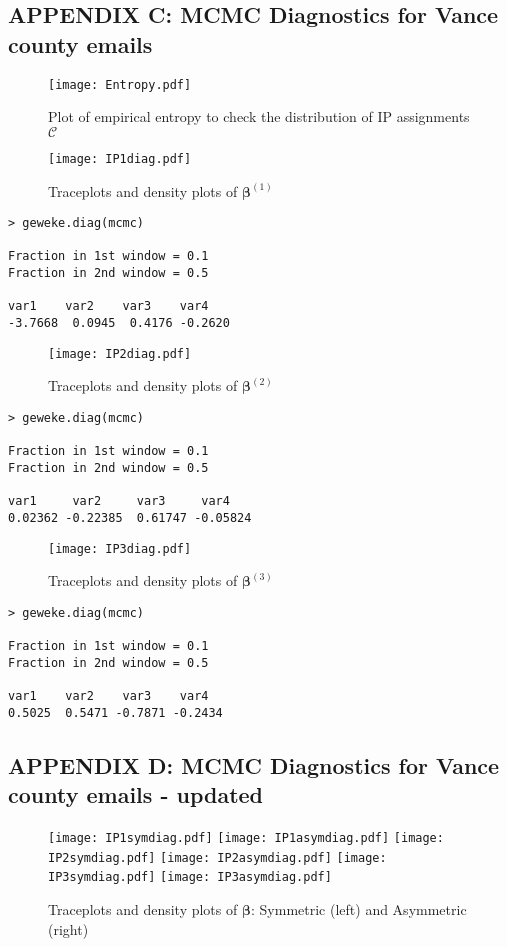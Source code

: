 \documentclass[a4paper]{article}
\begin{document}
 \subsection*{APPENDIX C: MCMC Diagnostics for Vance county emails}
 \begin{figure}[ht]
 	\centering
 	\texttt{[image: Entropy.pdf]} 
 	\caption{Plot of empirical entropy to check the distribution of IP assignments $\mathcal{C}$ }
 	\label{fig:IP1}
 \end{figure}
  \begin{figure}[ht]
 	\centering
 	\texttt{[image: IP1diag.pdf]} 
 		\caption{Traceplots and density plots of $\boldsymbol{\beta}^{(1)}$}
 	\label{fig:IP1}
 	 \end{figure}
\footnotesize
\begin{verbatim}
> geweke.diag(mcmc)

Fraction in 1st window = 0.1
Fraction in 2nd window = 0.5 

var1    var2    var3    var4 
-3.7668  0.0945  0.4176 -0.2620 
\end{verbatim} 	
\begin{figure}[ht]
	\centering
	\texttt{[image: IP2diag.pdf]} 
	\caption{Traceplots and density plots of $\boldsymbol{\beta}^{(2)}$}
	\label{fig:IP2}
\end{figure}
\footnotesize
\begin{verbatim}
> geweke.diag(mcmc)

Fraction in 1st window = 0.1
Fraction in 2nd window = 0.5 

var1     var2     var3     var4 
0.02362 -0.22385  0.61747 -0.05824 
\end{verbatim} 	 \clearpage
\begin{figure}[ht]
	\centering
	\texttt{[image: IP3diag.pdf]} 
	\caption{Traceplots and density plots of $\boldsymbol{\beta}^{(3)}$}
	\label{fig:IP3}
\end{figure}
\footnotesize
\begin{verbatim}
> geweke.diag(mcmc)

Fraction in 1st window = 0.1
Fraction in 2nd window = 0.5 

var1    var2    var3    var4 
0.5025  0.5471 -0.7871 -0.2434 
\end{verbatim} 	 
 \subsection*{APPENDIX D: MCMC Diagnostics for Vance county emails - updated}
 \begin{figure}[ht]
 	\centering
 	\texttt{[image: IP1symdiag.pdf]} 
 	 	\texttt{[image: IP1asymdiag.pdf]} 
 	 		\texttt{[image: IP2symdiag.pdf]} 
 	 		\texttt{[image: IP2asymdiag.pdf]} 
 	 			\texttt{[image: IP3symdiag.pdf]} 
 	 			\texttt{[image: IP3asymdiag.pdf]} 
 	\caption{Traceplots and density plots of $\boldsymbol{\beta}$: Symmetric (left) and Asymmetric (right)}
 	\label{fig:IP1sym}
 \end{figure}


\end{document}
